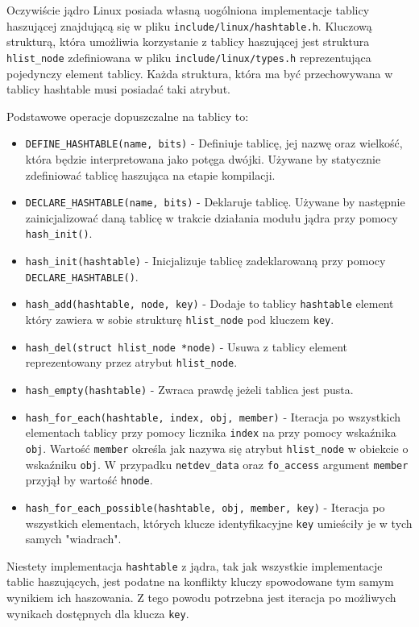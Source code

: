 \documentclass[10pt]{scrartcl}
\begin{document}
Oczywiście jądro Linux posiada własną uogólniona implementacje tablicy haszującej znajdującą się w pliku \texttt{include/linux/hashtable.h}.  Kluczową strukturą, która umożliwia korzystanie z tablicy haszującej jest struktura \texttt{hlist\_node} zdefiniowana w pliku \texttt{include/linux/types.h} reprezentująca pojedynczy element tablicy. Każda struktura, która ma być przechowywana w tablicy hashtable musi posiadać taki atrybut.

Podstawowe operacje dopuszczalne na tablicy to:

\begin{itemize}
\itemsep1pt\parskip0pt
\item
  \texttt{DEFINE\_HASHTABLE(name, bits)} - Definiuje tablicę, jej nazwę oraz wielkość, która będzie interpretowana jako potęga dwójki. Używane by statycznie zdefiniować tablicę haszująca na etapie kompilacji.
\item
  \texttt{DECLARE\_HASHTABLE(name, bits)} - Deklaruje tablicę. Używane by następnie zainicjalizować daną tablicę w trakcie działania modułu jądra przy pomocy \texttt{hash\_init()}.
\item
  \texttt{hash\_init(hashtable)} - Inicjalizuje tablicę zadeklarowaną przy pomocy \texttt{DECLARE\_HASHTABLE()}.
\item
  \texttt{hash\_add(hashtable, node, key)} - Dodaje to tablicy \texttt{hashtable} element który zawiera w sobie strukturę \texttt{hlist\_node} pod kluczem \texttt{key}.
\item
  \texttt{hash\_del(struct hlist\_node *node)} - Usuwa z tablicy element reprezentowany przez atrybut \texttt{hlist\_node}.
\item
  \texttt{hash\_empty(hashtable)} - Zwraca prawdę jeżeli tablica jest pusta.
\item
  \texttt{hash\_for\_each(hashtable, index, obj, member)} - Iteracja po wszystkich elementach tablicy przy pomocy licznika \texttt{index} na przy pomocy wskaźnika \texttt{obj}. Wartość \texttt{member} określa jak nazywa się atrybut \texttt{hlist\_node} w obiekcie o wskaźniku \texttt{obj}. W przypadku \texttt{netdev\_data} oraz \texttt{fo\_access} argument \texttt{member} przyjął by wartość \texttt{hnode}.
\item
  \texttt{hash\_for\_each\_possible(hashtable, obj, member, key)} - Iteracja po wszystkich elementach, których klucze identyfikacyjne \texttt{key} umieściły je w tych samych "wiadrach".
\end{itemize}

Niestety implementacja \texttt{hashtable} z jądra, tak jak wszystkie implementacje tablic haszujących, jest podatne na konflikty kluczy spowodowane tym samym wynikiem ich haszowania. Z tego powodu potrzebna jest iteracja po możliwych wynikach dostępnych dla klucza \texttt{key}.
\end{document}
